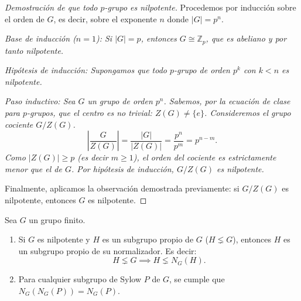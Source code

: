 
\begin{proof}[Demostración de que todo $p$-grupo es nilpotente]
    Procedemos por inducción sobre el orden de $G$, es decir, sobre el exponente $n$ donde $|G|=p^n$.
    
    \itshape Base de inducción ($n=1$): \normalfont
    Si $|G|=p$, entonces $G \cong \mathbb{Z}_p$, que es abeliano y por tanto nilpotente.
    
    \itshape Hipótesis de inducción: \normalfont
    Supongamos que todo $p$-grupo de orden $p^k$ con $k < n$ es nilpotente.
    
    \itshape Paso inductivo: \normalfont
    Sea $G$ un grupo de orden $p^n$. Sabemos, por la ecuación de clase para $p$-grupos, que el centro es no trivial: $Z(G) \neq \{e\}$.
    Consideremos el grupo cociente $G/Z(G)$.
    \begin{equation*}
        \left| \frac{G}{Z(G)} \right| = \frac{|G|}{|Z(G)|} = \frac{p^n}{p^m} = p^{n-m}.
    \end{equation*}
    Como $|Z(G)| \ge p$ (es decir $m \ge 1$), el orden del cociente es estrictamente menor que el de $G$.
    Por hipótesis de inducción, $G/Z(G)$ es nilpotente.
    
    Finalmente, aplicamos la observación demostrada previamente: si $G/Z(G)$ es nilpotente, entonces $G$ es nilpotente.
\end{proof}

\begin{lema}
    Sea $G$ un grupo finito.
    \begin{enumerate}
        \item Si $G$ es nilpotente y $H$ es un subgrupo propio de $G$ ($H \lneq G$), entonces $H$ es un subgrupo propio de su normalizador. Es decir:
        \begin{equation*}
            H \lneq G \implies H \lneq N_G(H).
        \end{equation*}
        \item Para cualquier subgrupo de Sylow $P$ de $G$, se cumple que $N_G(N_G(P)) = N_G(P)$.
    \end{enumerate}
\end{lema}

